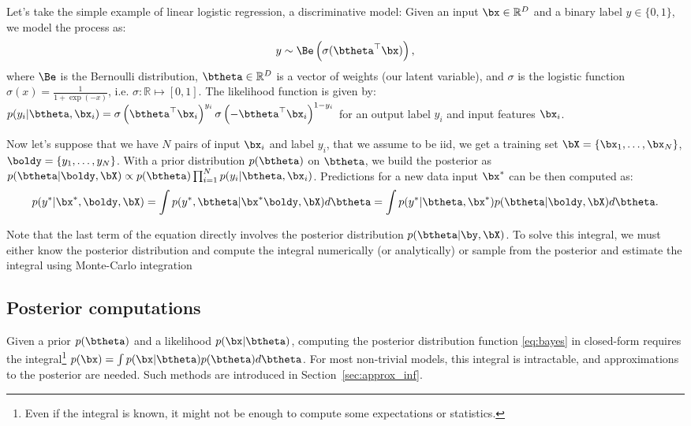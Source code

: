 Let's take the simple example of linear logistic regression, a discriminative model:
Given an input $\bx \in \mathbb{R}^D$ and a binary label $y\in \{ 0, 1\}$, we model the process as:
\begin{align}
    y \sim \Be\left(\sigma(\btheta^\top \bx)\right),
\end{align}
where $\Be$ is the Bernoulli distribution, $\btheta\in\mathbb{R}^D$ is a vector of weights (our latent variable), and $\sigma$ is the logistic function $\sigma(x) = \frac{1}{1 + \exp(-x)}$, i.e. $\sigma : \mathbb{R} \mapsto [0, 1]$.
The likelihood function is given by: $p(y_i|\btheta,\bx_i) =\sigma\left(\btheta^\top \bx_i\right)^{y_i}\sigma\left(-\btheta^\top \bx_i\right)^{1-y_i}$ for an output label $y_i$ and input features $\bx_i$.

Now let's suppose that we have $N$ pairs of input $\bx_i$ and label $y_i$, that we assume to be \ac{iid}, we get a training set $\bX = \{\bx_1,\ldots,\bx_N\}$, $\boldy = \{y_1,\ldots,y_N\}$.
With a prior distribution $p(\btheta)$ on $\btheta$, we build the posterior as $p(\btheta|\boldy,\bX) \propto p(\btheta)\prod_{i=1}^N p(y_i|\btheta, \bx_i)$.
Predictions for a new data input $\bx^*$ can be then computed as:
\begin{align}
p(y^*|\bx^*,\boldy,\bX) = \int p(y^*, \btheta|\bx^*\boldy, \bX)d\btheta = \int p(y^*|\btheta,\bx^*) p(\btheta|\boldy,\bX)d\btheta.
\end{align}

Note that the last term of the equation directly involves the posterior distribution $p(\btheta|\by,\bX)$.
To solve this integral, we must either know the posterior distribution and compute the integral numerically (or analytically) or sample from the posterior and estimate the integral using Monte-Carlo integration

\subsection{Posterior computations}
\label{sec:posterior}
Given a prior $p(\btheta)$ and a likelihood $p(\bx|\btheta)$, computing the posterior distribution function \eqref{eq:bayes} in closed-form requires the integral\footnote{Even if the integral is known, it might not be enough to compute some expectations or statistics.} $p(\bx)=\int p(\bx|\btheta)p(\btheta)d\btheta$.
For most non-trivial models, this integral is intractable, and approximations to the posterior are needed.
Such methods are introduced in Section~\ref{sec:approx_inf}.

